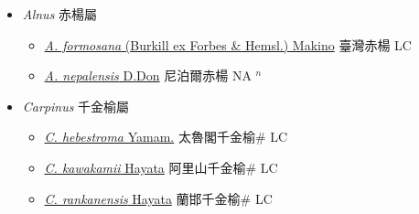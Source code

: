 
  \begin{itemize}
 \item[] \textit{Alnus} 赤楊屬
                    
  \begin{itemize}
        \item[] \href{http://www.theplantlist.org/tpl1.1/search?q=Alnus+formosana}{\textit{A. formosana} (Burkill ex Forbes \& Hemsl.) Makino}   臺灣赤楊 LC
        \item[] \href{http://www.theplantlist.org/tpl1.1/search?q=Alnus+nepalensis}{\textit{A. nepalensis} D.Don}   尼泊爾赤楊 NA $^n$
  \end{itemize}
 \item[] \textit{Carpinus} 千金榆屬
                    
  \begin{itemize}
        \item[] \href{http://www.theplantlist.org/tpl1.1/search?q=Carpinus+hebestroma}{\textit{C. hebestroma} Yamam.}   太魯閣千金榆\# LC
        \item[] \href{http://www.theplantlist.org/tpl1.1/search?q=Carpinus+kawakamii}{\textit{C. kawakamii} Hayata}   阿里山千金榆\# LC
        \item[] \href{http://www.theplantlist.org/tpl1.1/search?q=Carpinus+rankanensis}{\textit{C. rankanensis} Hayata}   蘭邯千金榆\# LC
  \end{itemize}
  \end{itemize}
